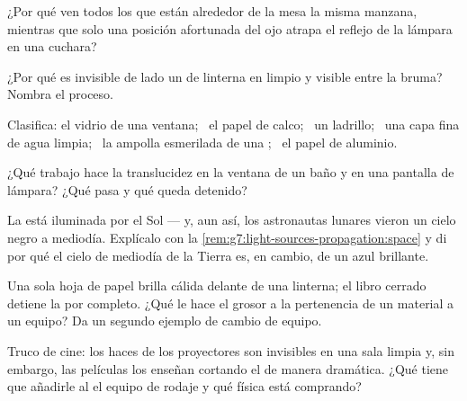\begin{exercise}[$\star$]\label{exo:g7:light-sources-propagation:4}
¿Por qué ven todos los que están alrededor de la mesa la misma
manzana, mientras que solo una posición afortunada del ojo atrapa el
reflejo de la lámpara en una cuchara?
\end{exercise}

\begin{exercise}[$\star$]\label{exo:g7:light-sources-propagation:5}
¿Por qué es invisible de lado un  de linterna en  limpio y
visible entre la bruma? Nombra el proceso.
\end{exercise}

\begin{exercise}[$\star$]\label{exo:g7:light-sources-propagation:6}
Clasifica: el vidrio de una ventana; \ el papel de calco; \ un
ladrillo; \ una capa fina de agua limpia; \ la ampolla esmerilada de
una ; \ el papel de aluminio.
\end{exercise}

\begin{exercise}[$\star$]\label{exo:g7:light-sources-propagation:7}
¿Qué trabajo hace la translucidez en la ventana de un baño y en una
pantalla de lámpara? ¿Qué pasa y qué queda detenido?
\end{exercise}

\begin{exercise}[$\star$]\label{exo:g7:light-sources-propagation:8}
La  está iluminada por el Sol --- y, aun así, los astronautas
lunares vieron un cielo negro a mediodía. Explícalo con la
\cref{rem:g7:light-sources-propagation:space} y di por qué el cielo de
mediodía de la Tierra es, en cambio, de un azul brillante.
\end{exercise}

\begin{exercise}[$\star\star$]\label{exo:g7:light-sources-propagation:9}
Una sola hoja de papel brilla cálida delante de una linterna; el libro
cerrado detiene la  por completo. ¿Qué le hace el grosor a la
pertenencia de un material a un equipo? Da un segundo ejemplo de
cambio de equipo.
\end{exercise}

\begin{exercise}[$\star\star$]\label{exo:g7:light-sources-propagation:10}
Truco de cine: los haces de los proyectores son invisibles en una
sala limpia y, sin embargo, las películas los enseñan cortando el
 de manera dramática. ¿Qué tiene que añadirle al  el
equipo de rodaje y qué física está comprando?
\end{exercise}

